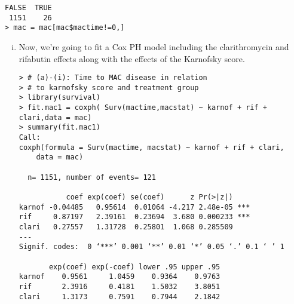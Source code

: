 \begin{enumerate}[(a)]
\begin{footnotesize}
\begin{verbatim}
FALSE  TRUE 
 1151    26 
> mac = mac[mac$mactime!=0,]
\end{verbatim}
\end{footnotesize}
\begin{enumerate}[(i)]
\item Now, we're going to fit a Cox PH model including the clarithromycin and rifabutin effects along with the effects of the Karnofsky score. 
\begin{footnotesize}
\begin{verbatim}
> # (a)-(i): Time to MAC disease in relation
> # to karnofsky score and treatment group
> library(survival)
> fit.mac1 = coxph( Surv(mactime,macstat) ~ karnof + rif + clari,data = mac)
> summary(fit.mac1)
Call:
coxph(formula = Surv(mactime, macstat) ~ karnof + rif + clari, 
    data = mac)

  n= 1151, number of events= 121 

           coef exp(coef) se(coef)      z Pr(>|z|)    
karnof -0.04485   0.95614  0.01064 -4.217 2.48e-05 ***
rif     0.87197   2.39161  0.23694  3.680 0.000233 ***
clari   0.27557   1.31728  0.25801  1.068 0.285509    
---
Signif. codes:  0 ‘***’ 0.001 ‘**’ 0.01 ‘*’ 0.05 ‘.’ 0.1 ‘ ’ 1

       exp(coef) exp(-coef) lower .95 upper .95
karnof    0.9561     1.0459    0.9364    0.9763
rif       2.3916     0.4181    1.5032    3.8051
clari     1.3173     0.7591    0.7944    2.1842


\end{verbatim}
\end{footnotesize}
\end{enumerate}
\end{enumerate}
